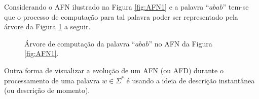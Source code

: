 \begin{exemplo}\label{exe:ArvoreComputacaoAFN}
	Considerando o AFN ilustrado na Figura \ref{fig:AFN1} e a palavra ``$abab$'' tem-se que o processo de computação para tal palavra poder ser representado pela árvore da Figura \ref{fig:ArvoreComputacaoAFN} a seguir.
	
	\begin{figure}[H]
		\centering
		\caption{Árvore de computação da palavra ``$abab$'' no AFN da Figura \ref{fig:AFN1}.}
		\label{fig:ArvoreComputacaoAFN}
	\end{figure}
\end{exemplo}

Outra forma de visualizar a evolução de um AFN (ou AFD) durante o processamento de uma palavra $w \in \Sigma^*$ é usando a ideia de descrição instantânea (ou descrição de momento).



